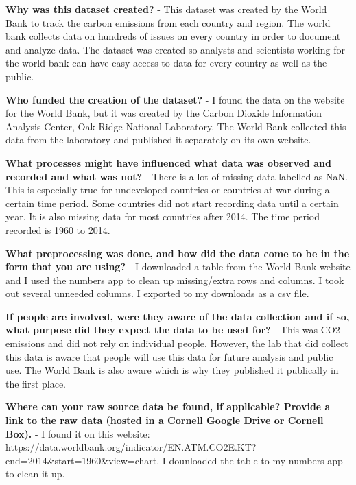 \documentclass[11pt]{article}
\begin{document}
\textbf{Why was this dataset created?} - This dataset was created by the
World Bank to track the carbon emissions from each country and region.
The world bank collects data on hundreds of issues on every country in
order to document and analyze data. The dataset was created so analysts
and scientists working for the world bank can have easy access to data
for every country as well as the public.

\textbf{Who funded the creation of the dataset?} - I found the data on
the website for the World Bank, but it was created by the Carbon Dioxide
Information Analysis Center, Oak Ridge National Laboratory. The World
Bank collected this data from the laboratory and published it separately
on its own website.

\textbf{What processes might have influenced what data was observed and
recorded and what was not?} - There is a lot of missing data labelled as
NaN. This is especially true for undeveloped countries or countries at
war during a certain time period. Some countries did not start recording
data until a certain year. It is also missing data for most countries
after 2014. The time period recorded is 1960 to 2014.

\textbf{What preprocessing was done, and how did the data come to be in
the form that you are using?} - I downloaded a table from the World Bank
website and I used the numbers app to clean up missing/extra rows and
columns. I took out several unneeded columns. I exported to my downloads
as a csv file.

\textbf{If people are involved, were they aware of the data collection
and if so, what purpose did they expect the data to be used for?} - This
was CO2 emissions and did not rely on individual people. However, the
lab that did collect this data is aware that people will use this data
for future analysis and public use. The World Bank is also aware which
is why they published it publically in the first place.

\textbf{Where can your raw source data be found, if applicable? Provide
a link to the raw data (hosted in a Cornell Google Drive or Cornell
Box).} - I found it on this website:
https://data.worldbank.org/indicator/EN.ATM.CO2E.KT?end=2014\&start=1960\&view=chart.
I dounloaded the table to my numbers app to clean it up.
\end{document}
